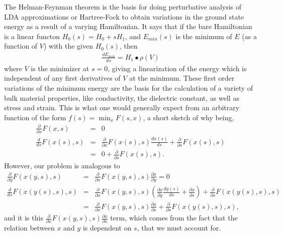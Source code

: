 \documentclass{article}
\newcommand{\beas}{\begin{eqnarray*}}
\newcommand{\enas}{\end{eqnarray*}}
\newcommand{\Vscp}{V}
\begin{document}
The Helman-Feynman theorem is the basis for
doing perturbative analysis of LDA approximations or Hartree-Fock to
obtain variations in the ground state energy
as a result of a varying Hamiltonian.
It says that if the bare Hamiltonian is a linear functon
$H_0(s) = H_0 + s H_1$,
and $E_{min}(s)$ is the minimum of $E$ (as a function of $\Vscp$)
with the given $H_0(s)$, then
\beas
\frac{d E_{min}}{d s} = H_1\bullet \rho(\Vscp)
\enas
where $\Vscp$ is the minimizer at $s=0$,
giving a linearization of the energy which is independent of
any first derivatives of $\Vscp$ at the minimum.
These first order variations of the minimum energy are the basis for
the calculation of a variety of bulk material properties, like conductivity,
the dielectric constant, as well as stress and strain.
This is
what one would generally expect from an arbitrary
function of the form $f(s) = \min_{x} F(s,x)$, a short sketch of
why being,
\beas
 \frac{\partial}{\partial x} F(x,s) &=& 0\\
 \frac{d}{d s} F(x(s),s) &=& \frac{\partial}{\partial x} F(x(s),s) \frac{dx(s)}{ds} + \frac{\partial}{\partial s} F(x(s),s)\\
                        &=& 0 + \frac{\partial}{\partial s} F(x(s),s).
\enas
However, our problem is analogous to
\beas
 \frac{\partial}{\partial y} F(x(y,s),s) &=&
 \frac{\partial}{\partial x} F(x(y,s),s) \frac{\partial x}{\partial y} = 0\\
 \frac{d}{d s} F(x(y(s),s),s) &=&
 \frac{\partial}{\partial x} F(x(y,s),s)
 \left(\frac{\partial x}{\partial y} \frac{dy(s)}{ds} + 
       \frac{\partial x}{\partial s}\right)
 + \frac{\partial}{\partial s} F(x(y(s),s),s)\\
                              &=&
 \frac{\partial}{\partial x} F(x(y,s),s)
       \frac{\partial x}{\partial s}
 + \frac{\partial}{\partial s} F(x(y(s),s),s),
\enas
and it is this 
$\frac{\partial}{\partial x} F(x(y,s),s)
       \frac{\partial x}{\partial s}$
term, which comes from the fact that the relation between $x$ and $y$ is
dependent on $s$,  that we must account for.
\end{document}
